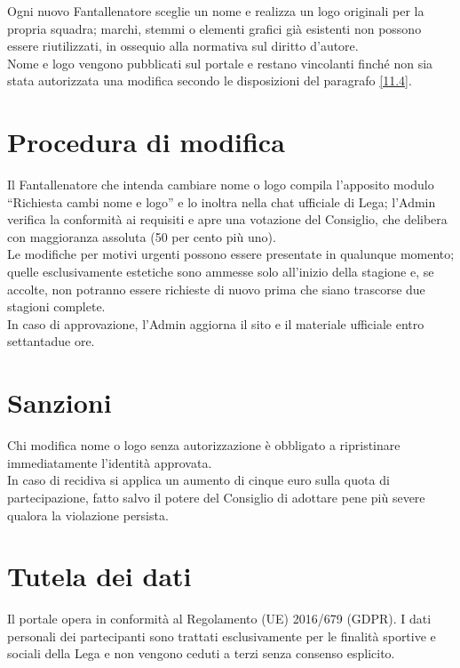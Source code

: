 Ogni nuovo Fantallenatore sceglie un nome e realizza un logo originali per la propria squadra; marchi, stemmi o elementi grafici già esistenti non possono essere riutilizzati, in ossequio alla normativa sul diritto d'autore.\\
Nome e logo vengono pubblicati sul portale e restano vincolanti finché non sia stata autorizzata una modifica secondo le disposizioni del paragrafo \ref{11.4}.

\section{Procedura di modifica}
\label{art:11.4}

Il Fantallenatore che intenda cambiare nome o logo compila l'apposito modulo “Richiesta cambi nome e logo” e lo inoltra nella chat ufficiale di Lega; l'Admin verifica la conformità ai requisiti e apre una votazione del Consiglio, che delibera con maggioranza assoluta (50 per cento più uno).\\
Le modifiche per motivi urgenti possono essere presentate in qualunque momento; quelle esclusivamente estetiche sono ammesse solo all'inizio della stagione e, se accolte, non potranno essere richieste di nuovo prima che siano trascorse due stagioni complete.\\
In caso di approvazione, l'Admin aggiorna il sito e il materiale ufficiale entro settantadue ore.

\section{Sanzioni}
\label{art:11.5}

Chi modifica nome o logo senza autorizzazione è obbligato a ripristinare immediatamente l'identità approvata.\\
In caso di recidiva si applica un aumento di cinque euro sulla quota di partecipazione, fatto salvo il potere del Consiglio di adottare pene più severe qualora la violazione persista.

\section{Tutela dei dati}
\label{art:11.6}

Il portale opera in conformità al Regolamento (UE) 2016/679 (GDPR). I dati personali dei partecipanti sono trattati esclusivamente per le finalità sportive e sociali della Lega e non vengono ceduti a terzi senza consenso esplicito.



